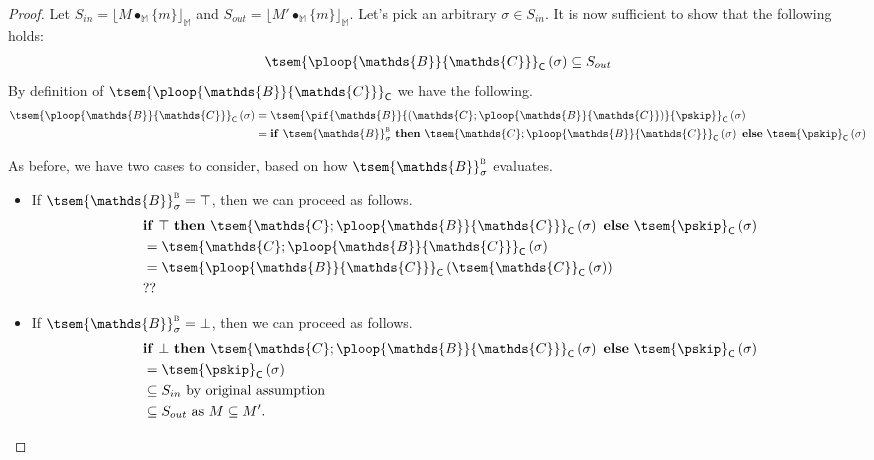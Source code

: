 {\begin{proof}
Let $S_{in} = \lfloor M \bullet_\mathbb{M} \{m\} \rfloor_\mathbb{M}$ and $S_{out} = \lfloor M' \bullet_\mathbb{M} \{m\} \rfloor_\mathbb{M}$. Let's pick an arbitrary $\sigma \in S_{in}$. It is now sufficient to show that the following holds:
\begin{gather}
	\tsem{\ploop{\mathds{B}}{\mathds{C}}}_\mathsf{C} \left( \sigma \right) \subseteq S_{out}
\end{gather}
By definition of $\tsem{\ploop{\mathds{B}}{\mathds{C}}}_\mathsf{C}$ we have the following.
\begin{align*}
	\tsem{\ploop{\mathds{B}}{\mathds{C}}}_\mathsf{C} \left( \sigma \right)
	&=
	\tsem{\pif{\mathds{B}}{\left(\mathds{C};\ploop{\mathds{B}}{\mathds{C}}\right)}{\pskip}}_\mathsf{C} \left( \sigma \right) \\
	&=
	\mathbf{if}\ \tsem{\mathds{B}}^\textsc{b}_\sigma\ \mathbf{then}\ \tsem{\mathds{C};\ploop{\mathds{B}}{\mathds{C}}}_\mathsf{C}\left( \sigma \right)\ \mathbf{else}\ \tsem{\pskip}_\mathsf{C}\left( \sigma \right)
\end{align*}

As before, we have two cases to consider, based on how $\tsem{\mathds{B}}_\sigma^\textsc{b}$ evaluates.
\begin{itemize}
	\item If $\tsem{\mathds{B}}_\sigma^\textsc{b} = \top$, then we can proceed as follows.
		\begin{align*}
			&\mathbf{if}\ \top\ \mathbf{then}\ \tsem{\mathds{C};\ploop{\mathds{B}}{\mathds{C}}}_\mathsf{C}\left( \sigma \right)\ \mathbf{else}\ \tsem{\pskip}_\mathsf{C}\left( \sigma \right)
			\\
			&= \tsem{\mathds{C};\ploop{\mathds{B}}{\mathds{C}}}_\mathsf{C}\left( \sigma \right)
			\\
			&= \tsem{\ploop{\mathds{B}}{\mathds{C}}}_\mathsf{C} \left( \tsem{\mathds{C}}_\mathsf{C}\left( \sigma \right) \right)
			\\
			& ??
		\end{align*}
	\item If $\tsem{\mathds{B}}_\sigma^\textsc{b} = \bot$, then we can proceed as follows.
		\begin{align*}
			&\mathbf{if}\ \bot\ \mathbf{then}\ \tsem{\mathds{C};\ploop{\mathds{B}}{\mathds{C}}}_\mathsf{C}\left( \sigma \right)\ \mathbf{else}\ \tsem{\pskip}_\mathsf{C}\left( \sigma \right)
			\\
			&= \tsem{\pskip}_\mathsf{C}\left( \sigma \right)
			\\
			&\subseteq S_{in} \text{ by original assumption}
			\\
			&\subseteq S_{out} \text{ as } M \subseteq M'.
		\end{align*}
\end{itemize}
\end{proof}
}

